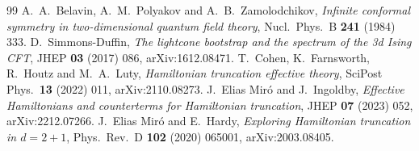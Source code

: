 \documentclass[11pt]{article}
\begin{document}
\begin{thebibliography}{99}
 A.~A.~Belavin, A.~M.~Polyakov and A.~B.~Zamolodchikov, \emph{Infinite conformal symmetry in two-dimensional quantum field theory}, Nucl.\ Phys.\ B \textbf{241} (1984) 333.
 D.~Simmons-Duffin, \emph{The lightcone bootstrap and the spectrum of the 3d Ising CFT}, JHEP \textbf{03} (2017) 086, arXiv:1612.08471.
 T.~Cohen, K.~Farnsworth, R.~Houtz and M.~A.~Luty, \emph{Hamiltonian truncation effective theory}, SciPost Phys.\ \textbf{13} (2022) 011, arXiv:2110.08273.
 J.~Elias Mir\'o and J.~Ingoldby, \emph{Effective Hamiltonians and counterterms for Hamiltonian truncation}, JHEP \textbf{07} (2023) 052, arXiv:2212.07266.
 J.~Elias Mir\'o and E.~Hardy, \emph{Exploring Hamiltonian truncation in $d=2+1$}, Phys.\ Rev.\ D \textbf{102} (2020) 065001, arXiv:2003.08405.
\end{thebibliography}
\end{document}

